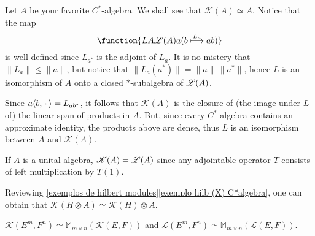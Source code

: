 \begin{exemplos}$\left.\right.$
    \label{exemplos: K( . )}
\begin{itroman}
    \item Let $A$ be your favorite $C^*$-algebra. We shall see that $\mathscr K(A) \simeq A$. Notice that the map 
    \begin{equation*}
        \function{{L}{A}{\adj(A)}{a}{
            (b \overset{L_a}\longmapsto ab)}}
    \end{equation*}
    is well defined since $L_{a^*}$ is the adjoint of $L_a$. It is no mistery that $\|L_a\| \leqslant \|a\|$, but notice that $\|L_a(a^*)\| = \|a\|\,\|a^*\|$, hence $L$ is an isomorphism of $A$ onto a closed $*$-subalgebra of $\mathscr L(A)$. \nocite{raeburn1998morita}
    
    Since $a\langle {b},{\operatorname{\,\cdot\,}}\rangle = L_{ab^*}$, it follows that $\mathscr K(A)$ is the closure of (the image under $L$ of) the linear span of products in $A$. But, since every $C^*$-algebra contains an approximate identity, the products above are dense, thus $L$ is an isomorphism between $A$ and $\mathscr K(A)$.   

    \item \label{exemplo item: K(A)=L(A) pra A unital} If $A$ is a unital algebra, $\mathscr K(A) = \mathscr L(A)$ since any adjointable operator $T$ consists of left multiplication by $T(1)$.
    
    \item Reviewing \ref{exemplos de hilbert modules}\ref{exemplo hilb (X) C*algebra}, one can obtain that $\mathscr K(H\otimes A) \simeq \mathscr K(H) \otimes A$. 
    
    \item $\mathscr K(E^m, F^n) \simeq \mathbb M_{m\times n}(\mathscr K(E, F))$ and $\mathscr L(E^m, F^n) \simeq \mathbb M_{m\times n}(\mathscr L(E, F))$.
    
\end{itroman}
\end{exemplos}

